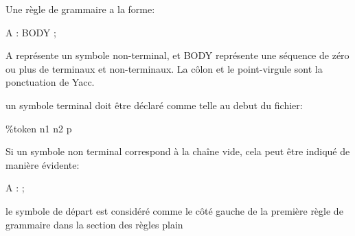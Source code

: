 \documentclass[10pt]{report}
\begin{document}
Une règle de grammaire a la forme:

A  :  BODY  ;

A représente un symbole non-terminal, et BODY représente une séquence de zéro ou plus de terminaux et non-terminaux. La côlon et le point-virgule sont la ponctuation de Yacc.

un symbole terminal doit être déclaré comme telle au debut du fichier:

\%token  n1  n2  p

Si un symbole non terminal correspond à la chaîne vide, cela peut être indiqué de manière évidente:

A : ;

le symbole de départ est considéré comme le côté gauche de la première règle de grammaire dans la section des règles
 {plain}
             
\end{document}
